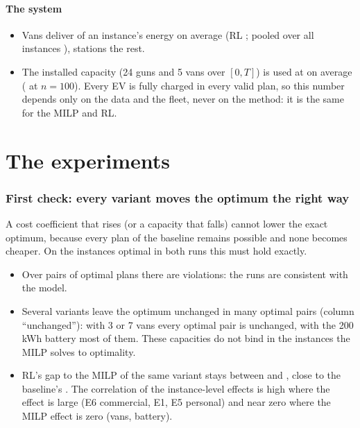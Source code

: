 \subsection{The system}
\begin{itemize}
  \item Vans deliver \UVanEnergyMilp\pct{} of an instance's energy on average (RL \UVanEnergyRl\pct; pooled over all instances \UVanEnergyPooledMilp\pct), stations the rest.
  \item The installed capacity (24 guns and 5 vans over $[0,T]$) is used at \USystemMilp\pct{} on average (\USystemMilpNhundred\pct{} at $n=100$). Every EV is fully charged in every valid plan, so this number depends only on the data and the fleet, never on the method: it is the same for the MILP and RL.
\end{itemize}

\part{The experiments}
\section{First check: every variant moves the optimum the right way}\label{sec:direction}
A cost coefficient that rises (or a capacity that falls) cannot lower the exact optimum, because every plan of the baseline remains possible and none becomes cheaper. On the instances optimal in both runs this must hold exactly.

\begin{itemize}
  \item Over \DirPairs{} pairs of optimal plans there are \DirBad{} violations: the runs are consistent with the model.
  \item Several variants leave the optimum unchanged in many optimal pairs (column ``unchanged''): with 3 or 7 vans every optimal pair is unchanged, with the 200\,kWh battery most of them. These capacities do not bind in the instances the MILP solves to optimality.
  \item RL's gap to the MILP of the same variant stays between \GapVarMin\pct{} and \GapVarMax\pct{}, close to the baseline's \GapMean\pct{}. The correlation of the instance-level effects is high where the effect is large (E6 commercial, E1, E5 personal) and near zero where the MILP effect is zero (vans, battery).
\end{itemize}

